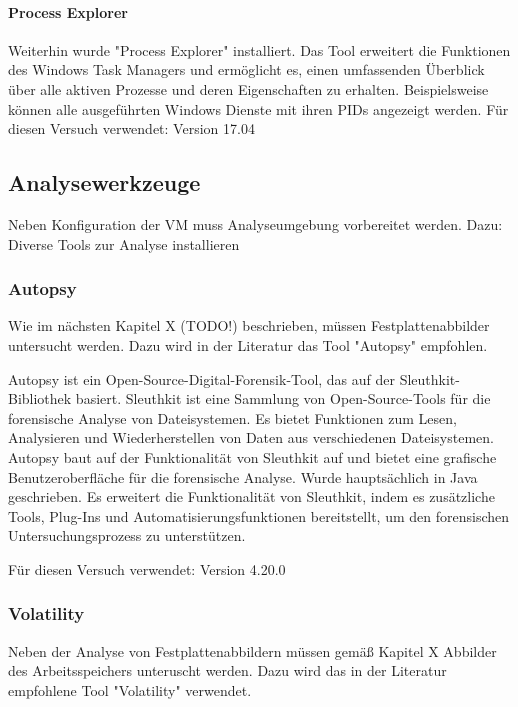\paragraph*{Process Explorer}
Weiterhin wurde "Process Explorer" installiert. Das Tool erweitert die Funktionen des Windows Task Managers und ermöglicht es, einen umfassenden Überblick über alle aktiven Prozesse und deren Eigenschaften zu erhalten. Beispielsweise können alle ausgeführten Windows Dienste mit ihren PIDs angezeigt werden.
Für diesen Versuch verwendet: Version 17.04

\subsection{Analysewerkzeuge}

Neben Konfiguration der VM muss Analyseumgebung vorbereitet werden.
Dazu: Diverse Tools zur Analyse installieren

\subsubsection*{Autopsy}
Wie im nächsten Kapitel X (TODO!) beschrieben, müssen Festplattenabbilder untersucht werden.
Dazu wird in der Literatur das Tool "Autopsy" empfohlen.

Autopsy ist ein Open-Source-Digital-Forensik-Tool, das auf der Sleuthkit-Bibliothek basiert. 
Sleuthkit ist eine Sammlung von Open-Source-Tools für die forensische Analyse von Dateisystemen. Es bietet Funktionen zum Lesen, Analysieren und Wiederherstellen von Daten aus verschiedenen Dateisystemen. 
Autopsy baut auf der Funktionalität von Sleuthkit auf und bietet eine grafische Benutzeroberfläche für die forensische Analyse. 
Wurde hauptsächlich in Java geschrieben.
Es erweitert die Funktionalität von Sleuthkit, indem es zusätzliche Tools, Plug-Ins und Automatisierungsfunktionen bereitstellt, um den forensischen Untersuchungsprozess zu unterstützen.
 
Für diesen Versuch verwendet: Version 4.20.0

\subsubsection*{Volatility}
Neben der Analyse von Festplattenabbildern müssen gemäß Kapitel X Abbilder des Arbeitsspeichers unteruscht werden. Dazu wird das in der Literatur empfohlene Tool "Volatility" verwendet.
 
